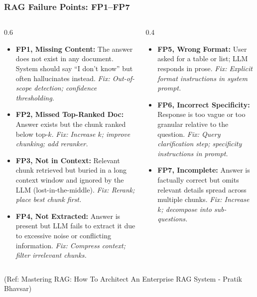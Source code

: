 \begin{frame}[fragile]\frametitle{RAG Failure Points: FP1--FP7}

\begin{columns}
  \begin{column}[T]{0.6\linewidth}
    \begin{itemize}
      \item \textbf{FP1, Missing Content:}
        The answer does not exist in any document. System should say ``I don't know'' but often hallucinates instead.
        \textit{Fix: Out-of-scope detection; confidence thresholding.}

      \item \textbf{FP2, Missed Top-Ranked Doc:}
        Answer exists but the chunk ranked below top-$k$.
        \textit{Fix: Increase $k$; improve chunking; add reranker.}

      \item \textbf{FP3, Not in Context:}
        Relevant chunk retrieved but buried in a long context window and ignored by the LLM (lost-in-the-middle).
        \textit{Fix: Rerank; place best chunk first.}

      \item \textbf{FP4, Not Extracted:}
        Answer is present but LLM fails to extract it due to excessive noise or conflicting information.
        \textit{Fix: Compress context; filter irrelevant chunks.}
    \end{itemize}
  \end{column}
  \begin{column}[T]{0.4\linewidth}
    \begin{itemize}
      \item \textbf{FP5, Wrong Format:}
        User asked for a table or list; LLM responds in prose.
        \textit{Fix: Explicit format instructions in system prompt.}

      \item \textbf{FP6, Incorrect Specificity:}
        Response is too vague or too granular relative to the question.
        \textit{Fix: Query clarification step; specificity instructions in prompt.}

      \item \textbf{FP7, Incomplete:}
        Answer is factually correct but omits relevant details spread across multiple chunks.
        \textit{Fix: Increase $k$; decompose into sub-questions.}
    \end{itemize}
  \end{column}
\end{columns}

{\tiny (Ref: Mastering RAG: How To Architect An Enterprise RAG System - Pratik Bhavsar)}

\end{frame}


